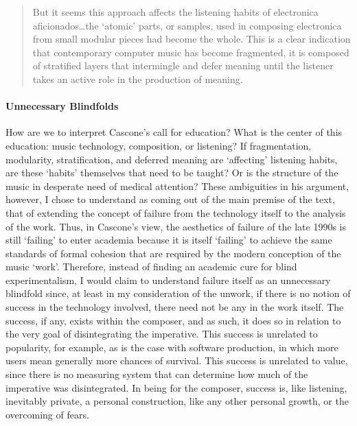 \begin{quote}
	But it seems this approach affects the listening habits of electronica aficionados\dots the `atomic' parts, or samples, used in composing electronica from small modular pieces had become the whole. This is a clear indication that contemporary computer music has become fragmented, it is composed of stratified layers that intermingle and defer meaning until the listener takes an active role in the production of meaning. \parencite[17]{Cas00:The}
\end{quote}

\paragraph{Unnecessary Blindfolds}
How are we to interpret Cascone's call for education? What is the center of this education: music technology, composition, or listening? If fragmentation, modularity, stratification, and deferred meaning are `affecting' listening habits, are these `habits' themselves that need to be taught? Or is the structure of the music in desperate need of medical attention? These ambiguities in his argument, however, I chose to understand as coming out of the main premise of the text, that of extending the concept of failure from the technology itself to the analysis of the work. Thus, in Cascone's view, the aesthetics of failure of the late 1990s is still `failing' to enter academia because it is itself `failing' to achieve the same standards of formal cohesion that are required by the modern conception of the music `work'. Therefore, instead of finding an academic cure for blind experimentalism, I would claim to understand failure itself as an unnecessary blindfold since, at least in my consideration of the unwork, if there is no notion of success in the technology involved, there need not be any in the work itself. The success, if any, exists within the composer, and as such, it does so in relation to the very goal of disintegrating the imperative. This success is unrelated to popularity, for example, as is the case with software production, in which more users mean generally more chances of survival. This success is unrelated to value, since there is no measuring system that can determine how much of the imperative was disintegrated. In being for the composer, success is, like listening, inevitably private, a personal construction, like any other personal growth, or the overcoming of fears.


